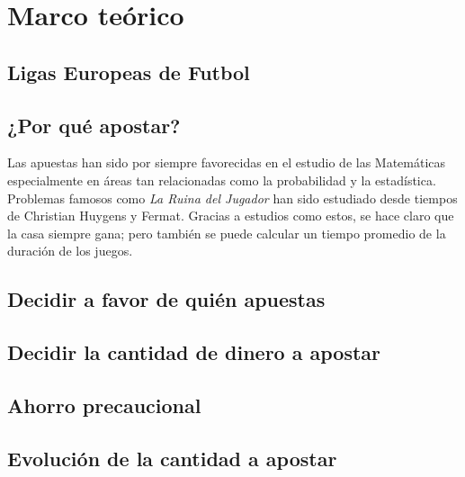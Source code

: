 \chapter{Marco teórico}
\section{Ligas Europeas de Futbol}


\section{¿Por qué apostar?}
Las apuestas han sido por siempre favorecidas en el estudio de las Matemáticas especialmente en áreas tan relacionadas como la probabilidad y la estadística.
Problemas famosos como \emph{La Ruina del Jugador}\cite[p.~95-99]{ross2006first} han sido estudiado desde tiempos de Christian Huygens y Fermat. Gracias a estudios como estos, se hace claro que la casa siempre gana; pero también se puede calcular un tiempo promedio de la duración de los juegos.


\section{Decidir a favor de quién apuestas}
\section{Decidir la cantidad de dinero a apostar}
\section{Ahorro precaucional}
\section{Evolución de la cantidad a apostar}
